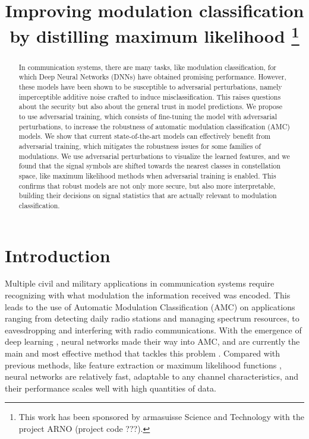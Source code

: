 \documentclass[conference]{IEEEtran}
\title{Improving modulation classification by distilling maximum likelihood
\thanks{This work has been sponsored by armasuisse Science and Technology with the project ARNO (project code ???).}
}
\author{\IEEEauthorblockN{Javier Maroto}
\IEEEauthorblockA{\textit{Signal Processing Laboratory (LTS4)} \\ \textit{EPFL, Switzerland}}
\and
\IEEEauthorblockN{Gérôme Bovet}
\IEEEauthorblockA{\textit{armasuisse Science\&Technology} \\
\textit{Cyber-Defence Campus, Switzerland}}
\and
\IEEEauthorblockN{Pascal Frossard}
\IEEEauthorblockA{\textit{Signal Processing Laboratory (LTS4)} \\ \textit{EPFL, Switzerland}}}
\begin{document}
\maketitle

\begin{abstract}
In communication systems, there are many tasks, like modulation classification, for which Deep Neural Networks (DNNs) have obtained promising performance. However, these models have been shown to be susceptible to adversarial perturbations, namely imperceptible additive noise crafted to induce misclassification. This raises questions about the security but also about the general trust in model predictions. We propose to use adversarial training, which consists of fine-tuning the model with adversarial perturbations, to increase the robustness of automatic modulation classification (AMC) models. We show that current state-of-the-art models can effectively benefit from adversarial training, which mitigates the robustness issues for some families of modulations. We use adversarial perturbations to visualize the learned features, and we found that the signal symbols are shifted towards the nearest classes in constellation space, like maximum likelihood methods when adversarial training is enabled. This confirms that robust models are not only more secure, but also more interpretable, building their decisions on signal statistics that are actually relevant to modulation classification.
\end{abstract}

\begin{IEEEkeywords}
\end{IEEEkeywords}

\section{Introduction}

Multiple civil and military applications in communication systems require recognizing with what modulation the information received was encoded. This leads to the use of Automatic Modulation Classification (AMC) on applications ranging from detecting daily radio stations and managing spectrum resources, to eavesdropping and interfering with radio communications. With the emergence of deep learning \cite{goodfellow2016deep}, neural networks made their way into AMC, and are currently the main and most effective method that tackles this problem \cite{OShea_Roy_Clancy_2018}. Compared with previous methods, like feature extraction \cite{xie2008efficient,zhou2013design,zhang2017wireless} or maximum likelihood functions \cite{huan1995likelihood,dobre2007survey,hameed2009likelihood}, neural networks are relatively fast, adaptable to any channel characteristics, and their performance scales well with high quantities of data.
\end{document}
